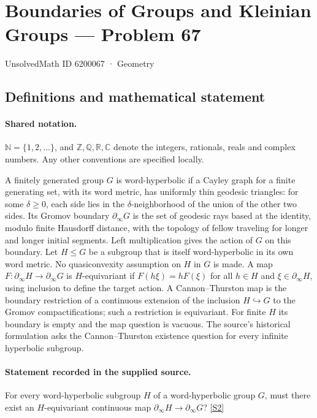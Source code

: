\documentclass[11pt]{article}
\newcommand{\sref}[2]{\hyperlink{source:#1:#2}{[S#2]}}
\begin{document}
\setcounter{section}{6200066}
\section{Boundaries of Groups and Kleinian Groups — Problem 67}\label{6200067}
{\small\sffamily UnsolvedMath ID 6200067 · Geometry}
\subsection{Definitions and mathematical statement}

\paragraph{Shared notation.}$\mathbb N=\{1,2,\ldots\}$, and $\mathbb Z,\mathbb Q,\mathbb R,\mathbb C$ denote the integers, rationals, reals and complex numbers. Any other conventions are specified locally.


A finitely generated group $G$ is word-hyperbolic if a Cayley graph for a finite generating set, with its word metric, has uniformly thin geodesic triangles: for some $\delta\geq0$, each side lies in the $\delta$-neighborhood of the union of the other two sides. Its Gromov boundary $\partial_\infty G$ is the set of geodesic rays based at the identity, modulo finite Hausdorff distance, with the topology of fellow traveling for longer and longer initial segments. Left multiplication gives the action of $G$ on this boundary.
Let $H\leq G$ be a subgroup that is itself word-hyperbolic in its own word metric. No quasiconvexity assumption on $H$ in $G$ is made. A map $F:\partial_\infty H\to\partial_\infty G$ is $H$-equivariant if $F(h\xi)=hF(\xi)$ for all $h\in H$ and $\xi\in\partial_\infty H$, using inclusion to define the target action. A Cannon--Thurston map is the boundary restriction of a continuous extension of the inclusion $H\hookrightarrow G$ to the Gromov compactifications; such a restriction is equivariant. For finite $H$ its boundary is empty and the map question is vacuous. The source's historical formulation asks the Cannon--Thurston existence question for every infinite hyperbolic subgroup.
\paragraph{Statement recorded in the supplied source.}
For every word-hyperbolic subgroup $H$ of a word-hyperbolic group $G$, must there exist an $H$-equivariant continuous map $\partial_\infty H\to\partial_\infty G$? \sref{6200067}{2}
\end{document}
